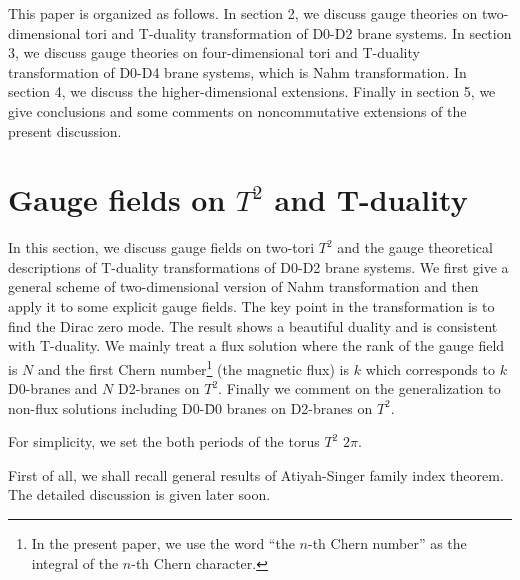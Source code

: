 \documentclass[a4paper,epsf,12pt]{article}
\begin{document}
This paper is organized as follows.
In section 2, we discuss gauge theories on two-dimensional tori and 
T-duality transformation of D0-D2 brane systems.
In section 3, we discuss gauge theories on four-dimensional tori and 
T-duality transformation of D0-D4 brane systems, which is Nahm transformation.
In section 4, we discuss the higher-dimensional extensions.
Finally in section 5, we give conclusions and 
some comments on noncommutative extensions of the present discussion.

\section{Gauge fields on $T^2$ and T-duality}

In this section, we discuss gauge fields on two-tori $T^2$
and the gauge theoretical descriptions of T-duality transformations
of D0-D2 brane systems.
We first give a general scheme of two-dimensional version of 
Nahm transformation and then apply it to
some explicit gauge fields.
The key point in the transformation is to find the Dirac zero mode.
The result shows a beautiful duality and is consistent with T-duality.
We mainly treat a flux solution where the rank of the gauge field
is $N$ and the first Chern number\footnote{In the present paper, we use
the word ``the $n$-th Chern number'' as the integral 
of the $n$-th Chern character.} (the magnetic flux) is $k$
which corresponds to $k$ D0-branes and $N$ D2-branes on $T^2$. 
Finally we comment on the generalization to non-flux solutions 
including  D0-\=D0 branes on D2-branes on $T^2$.

For simplicity, we set the both periods of the torus $T^2$ $2\pi$.

\vspace{2mm}

First of all, we shall recall general results of Atiyah-Singer 
family index theorem.
The detailed discussion is given later soon.
\end{document}
